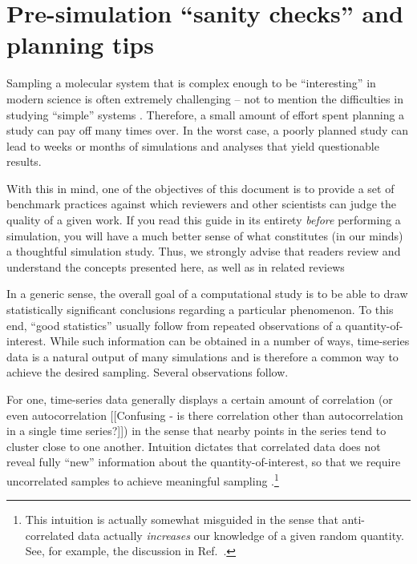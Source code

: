 \section{Pre-simulation ``sanity checks'' and planning tips}
\label{sec:sanity}

Sampling a molecular system that is complex enough to be ``interesting'' in modern science is often extremely challenging -- not to mention the difficulties in studying ``simple'' systems \cite{Schappals2017}.
Therefore, a small amount of effort spent planning a study can pay off many times over.  In the worst case, a poorly planned study can lead to weeks or months of simulations and analyses that yield questionable results.

With this in mind, one of the objectives of this document is to provide a set of benchmark practices against which reviewers and other scientists can judge the quality of a given work.  If you read this guide in its entirety \emph{before} performing a simulation, you will have a much better sense of what constitutes (in our minds) a thoughtful simulation study.  Thus, we strongly advise that readers review and understand the concepts presented here, as well as in related reviews \cite{Grossfield2009,JCGM:GUM2008,PatroneUQreview}


In a generic sense, the overall goal of a computational study is to be able to draw statistically significant conclusions regarding a particular phenomenon.  To this end, ``good statistics'' usually follow from repeated observations of a quantity-of-interest.  While such information can be obtained in a number of ways, time-series data is a natural output of many simulations and is therefore a common way to achieve the desired sampling.  Several observations follow.

For one, time-series data generally displays a certain amount of correlation (or even autocorrelation {\color{red}[[Confusing - is there correlation other than autocorrelation in a single time series?]]}) in the sense that nearby points in the series tend to cluster close to one another.  Intuition dictates that correlated data does not reveal fully ``new'' information about the quantity-of-interest, so that we require uncorrelated samples to achieve meaningful sampling \cite{PatroneAIAA}.\footnote{This intuition is actually somewhat misguided in the sense that anti-correlated data actually {\it increases} our knowledge of a given random quantity.  See, for example, the discussion in Ref.~\cite{PatroneAIAA}.}  

